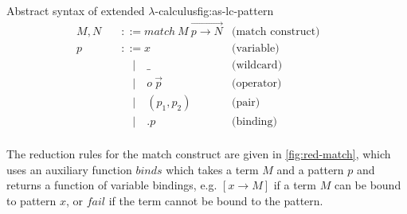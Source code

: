 \begin{myfigure}{Abstract syntax of extended $\lambda$-calculus}{fig:as-lc-pattern}
    \[
        \begin{aligned}
            M,N \quad & ::= match \ M \ \overrightarrow{p \rightarrow N} & \text{(match construct)} &  & \\
            p \quad   & ::= x                                            & \text{(variable)}        &  & \\
                      & \quad | \quad \_                                 & \text{(wildcard)}        &  & \\
                      & \quad | \quad o \ \Vec{p}                        & \text{(operator)}        &  & \\
                      & \quad | \quad (p_1,p_2)                          & \text{(pair)}            &  & \\
                      & \quad | \quad .p                                 & \text{(binding)}         &  & \\
        \end{aligned}
    \]
\end{myfigure}

The reduction rules for the match construct are given in \cref{fig:red-match}, which uses an auxiliary function $binds$ which takes a term $M$ and a pattern $p$ and returns a function of variable bindings, e.g. $[x \rightarrow M]$ if a term $M$ can be bound to pattern $x$, or $fail$ if the term cannot be bound to the pattern.

